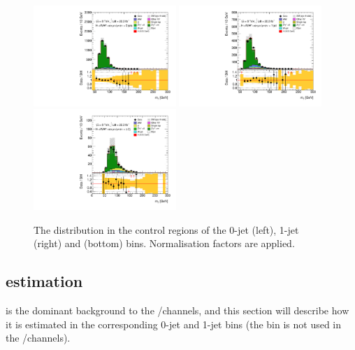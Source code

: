 \begin{figure}[t]
	\includegraphics[width=0.48\textwidth]{tex/backgrounds/emme_CutZttControl_0jet_MT_TrackHWW_Clj_mh125_lin}
	\hfill
	\includegraphics[width=0.48\textwidth]{tex/backgrounds/emme_CutZttControl_1jet_MT_TrackHWW_Clj_mh125_lin}
	\\
	\includegraphics[width=0.48\textwidth]{tex/backgrounds/emme_CutFailVBFZttCR_2jetincl_MT_TrackHWW_Clj_mh125_lin}
	\caption{The \mt distribution in the \DYtt control regions of the 0-jet (left), 1-jet 
	(right) and \twojet (bottom) bins. Normalisation factors are applied.}
	\label{fig:dytt:cr}
\end{figure}



\subsection{\DYll estimation}
\label{sec:dy:ll}

\DYll is the dominant background to the \eech/\mmch channels, and this section will 
describe how it is estimated in the corresponding 0-jet and 1-jet bins (the \twojet bin 
is not used in the \eech/\mmch channels).


